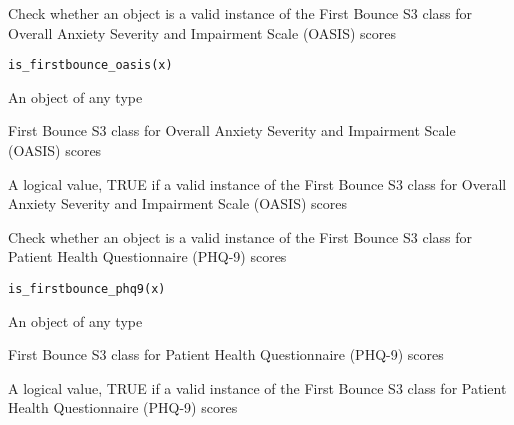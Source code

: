 \documentclass[a4paper]{book}
\begin{document}
%
\begin{Description}\relax
Check whether an object is a valid instance of the First Bounce S3 class for Overall Anxiety Severity and Impairment Scale (OASIS) scores
\end{Description}
%
\begin{Usage}
\begin{verbatim}
is_firstbounce_oasis(x)
\end{verbatim}
\end{Usage}
%
\begin{Arguments}
\begin{ldescription}
\item[\code{x}] An object of any type
\end{ldescription}
\end{Arguments}
%
\begin{Details}\relax
First Bounce S3 class for Overall Anxiety Severity and Impairment Scale (OASIS) scores
\end{Details}
%
\begin{Value}
A logical value, TRUE if a valid instance of the First Bounce S3 class for Overall Anxiety Severity and Impairment Scale (OASIS) scores
\end{Value}
%
\begin{Description}\relax
Check whether an object is a valid instance of the First Bounce S3 class for Patient Health Questionnaire (PHQ-9) scores
\end{Description}
%
\begin{Usage}
\begin{verbatim}
is_firstbounce_phq9(x)
\end{verbatim}
\end{Usage}
%
\begin{Arguments}
\begin{ldescription}
\item[\code{x}] An object of any type
\end{ldescription}
\end{Arguments}
%
\begin{Details}\relax
First Bounce S3 class for Patient Health Questionnaire (PHQ-9) scores
\end{Details}
%
\begin{Value}
A logical value, TRUE if a valid instance of the First Bounce S3 class for Patient Health Questionnaire (PHQ-9) scores
\end{Value}
\end{document}
